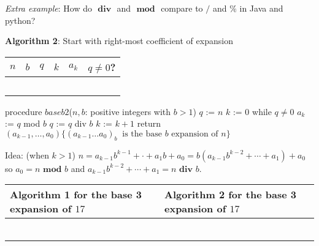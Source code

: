 \documentclass[12pt, oneside]{article}
\begin{document}
\textit{Extra example}: How do $\textbf{ div }$ and $\textbf{ mod }$ compare to $/$ and $\%$ in Java and python?


{\bf Algorithm 2}: Start with right-most coefficient of expansion

\begin{multicols}{2}
\begin{minipage}{3.2in}
\begin{tabular}{c|c|c|c|c|c}
$n$ & $b$  & $q$ & $k$ & $a_k$ & $q \neq 0$?\\
\hline 
\phantom{~$17$~} & \phantom{~$3$~} & \phantom{~$17$~} & \phantom{~$0$~} & \phantom{~~~} & \phantom{~T~}\\
\phantom{~$17$~} & \phantom{~$3$~} & \phantom{~$5$~} & \phantom{~$1$~} & \phantom{~$a_0 = 2$~} & \phantom{~T~}\\
\phantom{~$17$~} & \phantom{~$3$~} & \phantom{~$1$~} & \phantom{~$2$~} & \phantom{~$a_1 = 2$~} & \phantom{~T~}\\
\phantom{~$17$~} & \phantom{~$3$~} & \phantom{~$0$~} & \phantom{~$3$~} & \phantom{~$a_2 = 1$~} & \phantom{~F~}\\
&&&&&\\
\end{tabular}
\end{minipage}
\columnbreak
\begin{algorithm}[caption={Calculating base $b$ expansion, from right}]
procedure $\textit{baseb2}$($n, b$: positive integers with $b > 1$)
$q$ := $n$
$k$ := $0$
while $q  \neq 0$
  $a_{k}$ := $q$ mod $b$
  $q$ := $q$ div $b$
  $k$ := $k+1$
return $(a_{k-1}, \ldots, a_0) \{(a_{k-1} \ldots a_0)_b~\textrm{ is the base } b \textrm{ expansion of } n \}$
\end{algorithm}

Idea: {\tiny(when $k > 1$)} $n = a_{k-1} b^{k-1} + \cdot+ a_1 b + a_0 = b ( a_{k-1} b^{k-2} + \cdots + a_1) + a_0$
so $a_0 = n \textbf{ mod } b$ and $a_{k-1} b^{k-2} + \cdots + a_1 = n \textbf{ div } b$.
\end{multicols}


\begin{center}
\begin{tabular}{p{3.3in}|p{3.3in}}
Algorithm 1 for the base 3 expansion of $17$ &Algorithm 2 for the base 3 expansion of $17$  \\
\hline
 & \\
 & \\
 & \\
 & \\
  & \\
 & \\
\end{tabular}
\end{center}
\end{document}
